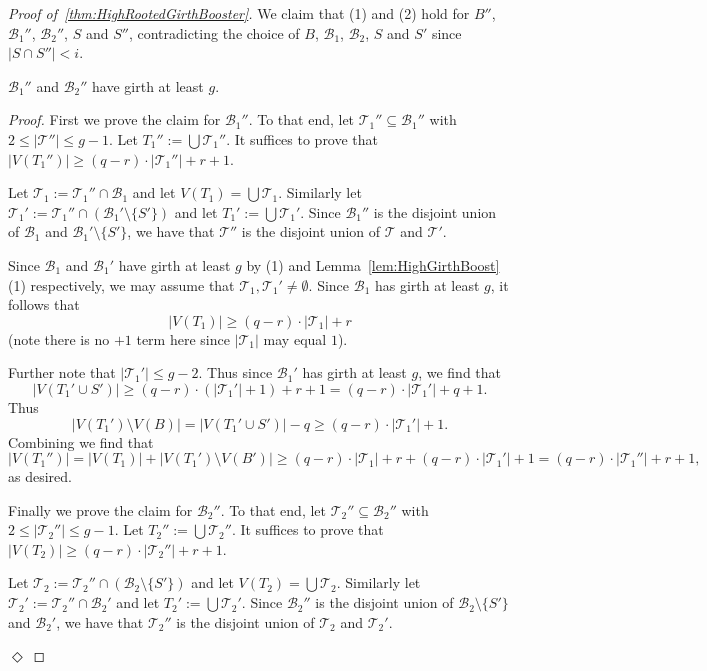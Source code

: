 \documentclass[11pt]{article}
\newcounter{i}
\theoremstyle{plain}
\newenvironment{proofclaim}[1][]%
{\noindent \emph{Proof.} {}{#1}{}}{\hfill
	$\Diamond$\vspace{1em}}
\renewcommand{\theclaim}{\thetheorem.\arabic{claim}}
\newenvironment{lateproof}[1]
 {%
  \renewcommand{\theclaim}{\ref{#1}.\arabic{claim}}%
  \begin{proof}[Proof of~\cref{#1}]%
 }
 {\end{proof}}
\theoremstyle{plain} %
\theoremstyle{definition}
\begin{document}
\begin{lateproof}{thm:HighRootedGirthBooster}
We claim that (1) and (2) hold for $B''$, $\mathcal{B}_1''$, $\mathcal{B}_2''$, $S$ and $S''$, contradicting the choice of $B$, $\mathcal{B}_1$, $\mathcal{B}_2$, $S$ and $S'$ since $|S\cap S''| < i$. 

\begin{claim}\label{claim:girthg2}
$\mathcal{B}_1''$ and $\mathcal{B}_2''$ have girth at least $g$.
\end{claim}
\begin{proofclaim}
First we prove the claim for $\mathcal{B}_1''$. To that end, let $\mathcal{T}_1'' \subseteq \mathcal{B}_1''$ with $2\le |\mathcal{T}''| \le g-1$. Let $T_1'':= \bigcup \mathcal{T}_1''$. It suffices to prove that $|V(T_1'')|\ge (q-r)\cdot |\mathcal{T}_1''| + r + 1$.

Let $\mathcal{T}_1 := \mathcal{T}_1''\cap \mathcal{B}_1$ and let $V(T_1) = \bigcup \mathcal{T}_1$. Similarly let $\mathcal{T}_1' := \mathcal{T}_1''\cap (\mathcal{B}_1'\setminus \{S'\})$ and let $T_1' := \bigcup \mathcal{T}_1'$. Since $\mathcal{B}_1''$ is the disjoint union of $\mathcal{B}_1$ and $\mathcal{B}_1'\setminus \{S'\}$, we have that $\mathcal{T}''$ is the disjoint union of $\mathcal{T}$ and $\mathcal{T}'$.

Since $\mathcal{B}_1$ and $\mathcal{B}_1'$ have girth at least $g$ by (1) and Lemma~\ref{lem:HighGirthBoost}(1) respectively, we may assume that $\mathcal{T}_1,\mathcal{T}_1'\ne\emptyset$. Since $\mathcal{B}_1$ has girth at least $g$, it follows that $$|V(T_1)|\ge (q-r)\cdot |\mathcal{T}_1| + r$$ 
(note there is no $+1$ term here since $|\mathcal{T}_1|$ may equal $1$). 

Further note that $|\mathcal{T}_1'| \le g-2$. Thus since $\mathcal{B}_1'$ has girth at least $g$, we find that 
$$|V(T_1'\cup S')| \ge (q-r)\cdot (|\mathcal{T}_1'|+1)+r+1=(q-r)\cdot |\mathcal{T}_1'| + q + 1.$$
Thus 
$$|V(T_1')\setminus V(B)| =|V(T_1'\cup S')|-q\ge (q-r)\cdot |\mathcal{T}_1'|+1.$$
Combining we find that
$$|V(T_1'')| = |V(T_1)|+|V(T_1')\setminus V(B')| \ge (q-r)\cdot |\mathcal{T}_1| + r + (q-r)\cdot |\mathcal{T}_1'| + 1 = (q-r)\cdot |\mathcal{T}_1''| + r + 1,$$
as desired.

Finally we prove the claim for $\mathcal{B}_2''$. To that end, let $\mathcal{T}_2'' \subseteq \mathcal{B}_2''$ with $2\le |\mathcal{T}_2''| \le g-1$. Let $T_2'':= \bigcup \mathcal{T}_2''$. It suffices to prove that $|V(T_2)|\ge (q-r)\cdot |\mathcal{T}_2''| + r + 1$.

Let $\mathcal{T}_2 := \mathcal{T}_2''\cap (\mathcal{B}_2\setminus \{S'\})$ and let $V(T_2) = \bigcup \mathcal{T}_2$. Similarly let $\mathcal{T}_2' := \mathcal{T}_2''\cap \mathcal{B}_2'$ and let $T_2' := \bigcup \mathcal{T}_2'$. Since $\mathcal{B}_2''$ is the disjoint union of $\mathcal{B}_2\setminus \{S'\}$ and $\mathcal{B}_2'$, we have that $\mathcal{T}_2''$ is the disjoint union of $\mathcal{T}_2$ and $\mathcal{T}_2'$.



\end{proofclaim}
\end{lateproof}
\end{document}
